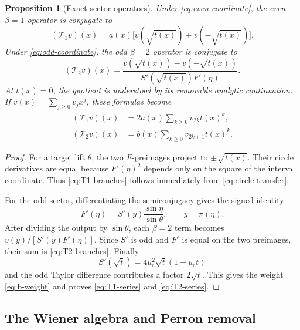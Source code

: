 \documentclass[11pt]{article}
\newtheorem{proposition}[theorem]{Proposition}
\theoremstyle{definition}
\theoremstyle{remark}
\newcommand{\uc}{u_{\mathrm c}}
\newcommand{\cT}{\mathcal T}
\begin{document}
\begin{proposition}[Exact sector operators]
\label{prop:sector-operators}
Under \eqref{eq:even-coordinate}, the even $\beta=1$ operator is conjugate to
\begin{equation}\label{eq:T1-branches}
 (\cT_1v)(x)=a(x)\bigl[v(\sqrt{t(x)})+v(-\sqrt{t(x)})\bigr].
\end{equation}
Under \eqref{eq:odd-coordinate}, the odd $\beta=2$ operator is conjugate to
\begin{equation}\label{eq:T2-branches}
 (\cT_2v)(x)=
 \frac{v(\sqrt{t(x)})-v(-\sqrt{t(x)})}
 {S'(\sqrt{t(x)})F'(\eta)}.
\end{equation}
At $t(x)=0$, the quotient is understood by its removable analytic
continuation.
If $v(x)=\sum_{j\ge0}v_jx^j$, these formulas become
\begin{align}
 (\cT_1v)(x)
 &=2a(x)\sum_{k\ge0}v_{2k}t(x)^k,
 \label{eq:T1-series}\\
 (\cT_2v)(x)
 &=b(x)\sum_{k\ge0}v_{2k+1}t(x)^k.
 \label{eq:T2-series}
\end{align}
\end{proposition}

\begin{proof}
For a target lift $\theta$, the two $F$-preimages project to
$\pm\sqrt{t(x)}$.  Their circle derivatives are equal because
$F'(\eta)^2$ depends only on the square of the interval coordinate.  Thus
\eqref{eq:T1-branches} follows immediately from \eqref{eq:circle-transfer}.

For the odd sector, differentiating the semiconjugacy gives the signed
identity
\begin{equation}\label{eq:sine-derivative}
 F'(\eta)=S'(y)\frac{\sin\eta}{\sin\theta},
 \qquad y=\pi(\eta).
\end{equation}
After dividing the output by $\sin\theta$, each $\beta=2$ term becomes
$v(y)/[S'(y)F'(\eta)]$.  Since $S'$ is odd and $F'$ is equal on the two
preimages, their sum is \eqref{eq:T2-branches}.  Finally
\begin{equation}\label{eq:Sprime-g}
 S'(\sqrt t)=4\uc^2\sqrt t(1-\uc t)
\end{equation}
and the odd Taylor difference contributes a factor $2\sqrt t$.  This gives
the weight \eqref{eq:b-weight} and proves
\eqref{eq:T1-series} and \eqref{eq:T2-series}.
\end{proof}

\subsection{The Wiener algebra and Perron removal}
\end{document}
